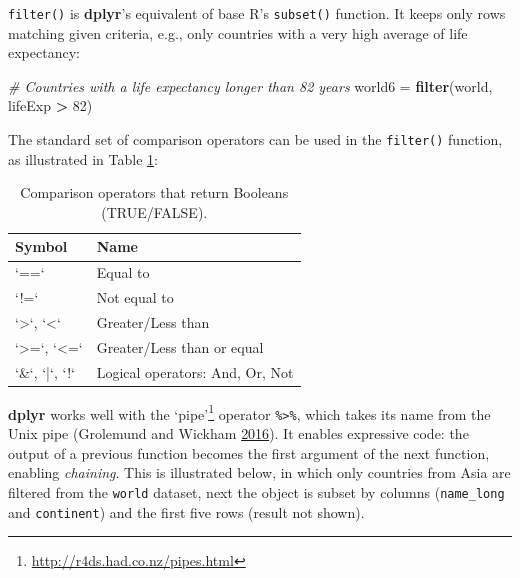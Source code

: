 \documentclass[]{krantz}
\newenvironment{Shaded}{\begin{snugshade}}{\end{snugshade}}
\newcommand{\CommentTok}[1]{\textcolor[rgb]{0.37,0.37,0.37}{\textit{#1}}}
\newcommand{\DecValTok}[1]{\textcolor[rgb]{0.06,0.06,0.06}{#1}}
\newcommand{\KeywordTok}[1]{\textcolor[rgb]{0.27,0.27,0.27}{\textbf{#1}}}
\newcommand{\NormalTok}[1]{#1}
\newcommand{\OperatorTok}[1]{\textcolor[rgb]{0.43,0.43,0.43}{\textbf{#1}}}
\newcommand{\StringTok}[1]{\textcolor[rgb]{0.5,0.5,0.5}{#1}}
\let\rmarkdownfootnote\footnote%
\def\footnote{\protect\rmarkdownfootnote}
\renewcommand{\href}[2]{#2\footnote{\url{#1}}}
\begin{document}
\texttt{filter()} is \textbf{dplyr}'s equivalent of base R's \texttt{subset()} function.
It keeps only rows matching given criteria, e.g., only countries with a very high average of life expectancy:

\begin{Shaded}
\begin{Highlighting}[]
\CommentTok{# Countries with a life expectancy longer than 82 years}
\NormalTok{world6 =}\StringTok{ }\KeywordTok{filter}\NormalTok{(world, lifeExp }\OperatorTok{>}\StringTok{ }\DecValTok{82}\NormalTok{)}
\end{Highlighting}
\end{Shaded}

The standard set of comparison operators can be used in the \texttt{filter()} function, as illustrated in Table \ref{tab:operators}:

\begin{table}[t]

\caption[Comparison operators that return Booleans.]{\label{tab:operators}Comparison operators that return Booleans (TRUE/FALSE).}
\centering
\begin{tabular}{ll}
\toprule
Symbol & Name\\
\midrule
`==` & Equal to\\
`!=` & Not equal to\\
`>`, `<` & Greater/Less than\\
`>=`, `<=` & Greater/Less than or equal\\
`\&`, `|`, `!` & Logical operators: And, Or, Not\\
\bottomrule
\end{tabular}
\end{table}

\textbf{dplyr} works well with the \href{http://r4ds.had.co.nz/pipes.html}{`pipe'} operator \texttt{\%\textgreater{}\%}, which takes its name from the Unix pipe \texttt{\textbar{}} (Grolemund and Wickham \protect\hyperlink{ref-grolemund_r_2016}{2016}).
It enables expressive code: the output of a previous function becomes the first argument of the next function, enabling \emph{chaining}.
This is illustrated below, in which only countries from Asia are filtered from the \texttt{world} dataset, next the object is subset by columns (\texttt{name\_long} and \texttt{continent}) and the first five rows (result not shown).

\begin{Shaded}
\end{Shaded}
\end{document}
